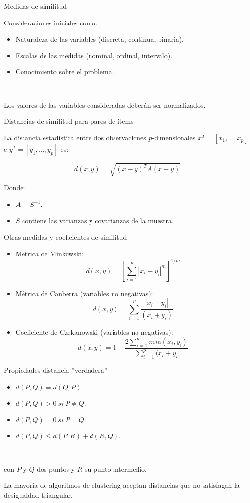 \documentclass[spanish]{beamer}
\begin{document}
\begin{frame}{Medidas de similitud}

Consideraciones iniciales como:\break

\begin{itemize}
\item Naturaleza de las variables (discreta, continua, binaria).
\item Escalas de las medidas (nominal, ordinal, intervalo).
\item Conocimiento sobre el problema.
\end{itemize}\

Los valores de las variables consideradas deberán ser normalizados.
\end{frame}

\begin{frame}{Distancias de similitud para pares de ítems}

La distancia estadística entre dos observaciones $p$-dimensionales $x^T = [x_1,\dots,x_p]$ e $y^T=[y_1,\dots,y_p]$ es:

$$d(x,y)=\sqrt{(x-y)^TA(x-y)} $$

Donde: \break
\begin{itemize}
\item $A=S^{-1}$. 
\item $S$ contiene las varianzas y covarianzas de la muestra.
\end{itemize}
\end{frame}

\begin{frame}{Otras medidas y coeficientes de similitud}

\begin{itemize}
\item Métrica de Minkowski:
$$ d(x,y)=\left  [\sum_{i=1}^{p}{|x_i-y_i|^m} \right ]^{1/m}$$
\item Métrica de Canberra (variables no negativas):
$$d(x,y)=\sum_{i=1}^{p}{\frac{|x_i-y_i|}{(x_i+y_i)}}$$
\item Coeficiente de Czekanowski (variables no negativas):
$$d(x,y)=1-\frac{2\sum_{i=1}^{p}{min(x_i,y_i)}}{\sum_{i=1}^{p}{(x_i+y_i}}$$
\end{itemize}
\end{frame}

\begin{frame}{Propiedades distancia ''verdadera''}
\begin{itemize}
\item $d(P,Q)=d(Q,P)$.
\item $d(P,Q)>0\ si\ P\neq Q$.
\item $d(P,Q)=0\ si\ P=Q$.
\item $d(P,Q)\leq d(P,R)+d(R,Q)$.
\end{itemize}\

con $P$ y $Q$ dos puntos y $R$ su punto intermedio.\break

La mayoría de algoritmos de clustering aceptan distancias que no satisfagan la desigualdad triangular.
\end{frame}
\end{document}
